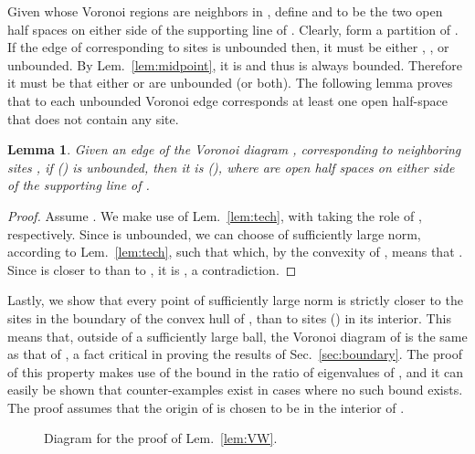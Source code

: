\documentclass[11pt]{article}
\newtheorem{lemma}[theorem]{Lemma}
\begin{document}
Given  whose Voronoi regions are neighbors in , define  and  to be the two open half spaces 
on either side of the supporting line
 of . Clearly,  form a partition of
. 
If the edge  of  corresponding to sites  is unbounded
then, it must be either , , or
 unbounded.
By Lem.~\ref{lem:midpoint}, it is  
and thus  is always bounded. 
Therefore it must be that either  or
 are unbounded (or both). 
The following lemma proves that to each unbounded Voronoi edge corresponds
at least one open half-space that does not contain any site. 






\begin{lemma}\label{lem:halfspace}
    Given an edge  of the Voronoi diagram , corresponding to neighboring sites , if  () is unbounded, then it is 
 (), 
where  are open half spaces on either side of the
supporting line of . 
\end{lemma}
\begin{proof}
Assume . 
We make use of Lem.~\ref{lem:tech}, with 
taking the role of , respectively. Since  is unbounded, 
we can choose  of sufficiently large norm, according to
Lem.~\ref{lem:tech}, 
such that  which, 
by the convexity of , means that . 
Since  is closer to  than to , it is , a
contradiction. 
\end{proof}



Lastly, we show that every point of sufficiently large norm is strictly closer to
the sites  in the boundary of the convex
hull of , than to sites () in its interior. This means that, outside of a sufficiently large ball, the Voronoi 
diagram of  is the same as that of , a fact critical in proving the
results of Sec.~\ref{sec:boundary}. The proof of this property makes use of the
bound in the ratio of eigenvalues of , and it can easily be shown that
counter-examples exist in cases where no such bound exists. 
The proof assumes that the origin of  is chosen to be in the interior of . 


\begin{figure}
\centering
{}
\quad\quad {}
\label{fig:vH}
\caption{Diagram for the proof of Lem.~\ref{lem:VW}.}
\end{figure}
\end{document}
